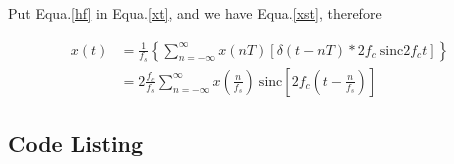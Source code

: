 \documentclass{article}
\begin{document}
Put Equa.\ref{hf} in Equa.\ref{xt}, and we have Equa.\ref{xst}, therefore

\begin{align}
    x(t) &= \frac{1}{f_s} \left\{ \sum_{n = -\infty}^{\infty} x(nT) \left[ \delta(t - nT) * 2f_c ~ \mathrm{sinc} 2f_c t \right] \right\}\nonumber \\
    &= 2 \frac{f_c}{f_s} \sum_{n = -\infty}^{\infty}  x(\frac{n}{f_s}) ~ \mathrm{sinc}\left[ 2f_c(t - \frac{n}{f_s}) \right]
\end{align}



% 
% 

\begin{appendices}
    \section{Code Listing}

\end{appendices}
\end{document}
